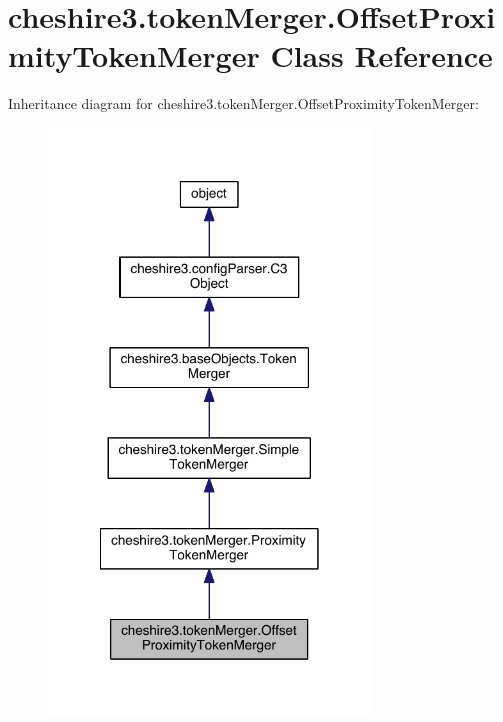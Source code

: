 \hypertarget{classcheshire3_1_1token_merger_1_1_offset_proximity_token_merger}{\section{cheshire3.\-token\-Merger.\-Offset\-Proximity\-Token\-Merger Class Reference}
\label{classcheshire3_1_1token_merger_1_1_offset_proximity_token_merger}
}


Inheritance diagram for cheshire3.\-token\-Merger.\-Offset\-Proximity\-Token\-Merger\-:
\nopagebreak
\begin{figure}[H]
\begin{center}
\leavevmode
\includegraphics[width=242pt]{classcheshire3_1_1token_merger_1_1_offset_proximity_token_merger__inherit__graph}
\end{center}
\end{figure}


